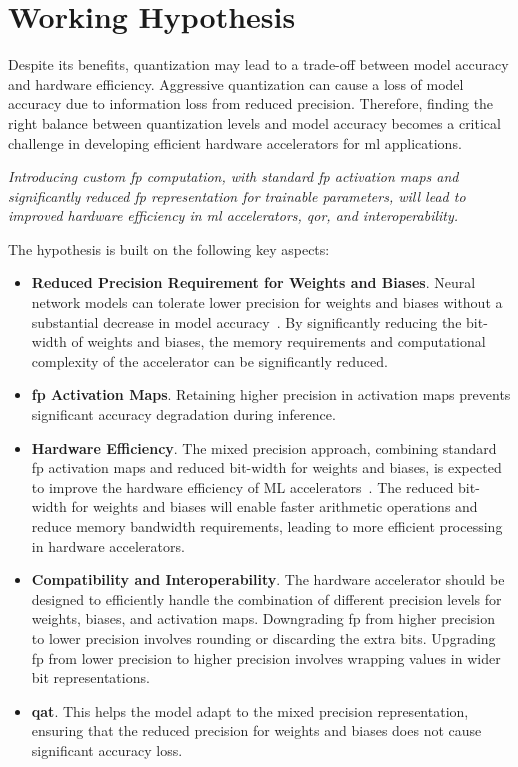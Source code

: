 \section{Working Hypothesis}
Despite its benefits, quantization may lead to a trade-off between model accuracy and hardware efficiency. Aggressive quantization can cause a loss of model accuracy due to information loss from reduced precision. Therefore, finding the right balance between quantization levels and model accuracy becomes a critical challenge in developing efficient hardware accelerators for \gls{ml} applications.

\textit{Introducing custom \gls{fp} computation, with standard \gls{fp} activation maps and significantly reduced \gls{fp} representation for trainable parameters, will lead to improved hardware efficiency in \gls{ml} accelerators, \gls{qor}, and interoperability.
}

The hypothesis is built on the following key aspects:

\begin{itemize}
	\item \textbf{Reduced Precision Requirement for Weights and Biases}. Neural network models can tolerate lower precision for weights and biases without a substantial decrease in model accuracy~\cite{lai2017deep}. By significantly reducing the bit-width of weights and biases, the memory requirements and computational complexity of the accelerator can be significantly reduced.
	\item \textbf{\gls{fp} Activation Maps}. Retaining higher precision in activation maps prevents significant accuracy degradation during inference.
	\item \textbf{Hardware Efficiency}. The mixed precision approach, combining standard \gls{fp} activation maps and reduced bit-width for weights and biases, is expected to improve the hardware efficiency of ML accelerators~\cite{lai2017deep}. The reduced bit-width for weights and biases will enable faster arithmetic operations and reduce memory bandwidth requirements, leading to more efficient processing in hardware accelerators.
	\item \textbf{Compatibility and Interoperability}. The hardware accelerator should be designed to efficiently handle the combination of different precision levels for weights, biases, and activation maps. Downgrading \gls{fp} from higher precision to lower precision involves rounding or discarding the extra bits. Upgrading \gls{fp} from lower precision to higher precision involves wrapping values in wider bit representations.
	\item \textbf{\gls{qat}}. This helps the model adapt to the mixed precision representation, ensuring that the reduced precision for weights and biases does not cause significant accuracy loss.
\end{itemize}

